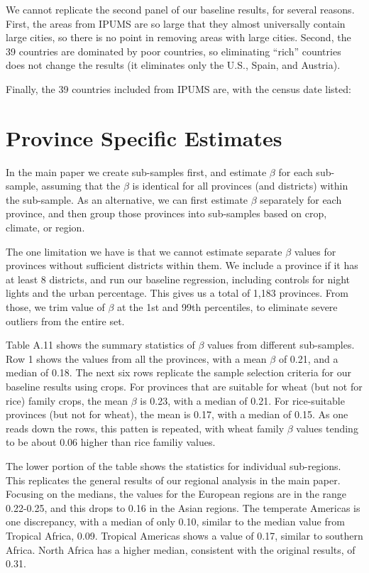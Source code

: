 \documentclass[11pt]{article}
\begin{document}
We cannot replicate the second panel of our baseline results, for several reasons. First, the areas from IPUMS are so large that they almost universally contain large cities, so there is no point in removing areas with large cities. Second, the 39 countries are dominated by poor countries, so eliminating ``rich'' countries does not change the results (it eliminates only the U.S., Spain, and Austria). 

Finally, the 39 countries included from IPUMS are, with the census date listed: 


\section{Province Specific Estimates}
In the main paper we create sub-samples first, and estimate $\beta$ for each sub-sample, assuming that the $\beta$ is identical for all provinces (and districts) within the sub-sample. As an alternative, we can first estimate $\beta$ separately for each province, and then group those provinces into sub-samples based on crop, climate, or region. 

The one limitation we have is that we cannot estimate separate $\beta$ values for provinces without sufficient districts within them. We include a province if it has at least 8 districts, and run our baseline regression, including controls for night lights and the urban percentage. This gives us a total of 1,183 provinces. From those, we trim value of $\beta$ at the 1st and 99th percentiles, to eliminate severe outliers from the entire set. 

Table A.11 shows the summary statistics of $\beta$ values from different sub-samples. Row 1 shows the values from all the provinces, with a mean $\beta$ of 0.21, and a median of 0.18. The next six rows replicate the sample selection criteria for our baseline results using crops. For provinces that are suitable for wheat (but not for rice) family crops, the mean $\beta$ is 0.23, with a median of 0.21. For rice-suitable provinces (but not for wheat), the mean is 0.17, with a median of 0.15. As one reads down the rows, this patten is repeated, with wheat family $\beta$ values tending to be about 0.06 higher than rice familiy values. 

The lower portion of the table shows the statistics for individual sub-regions. This replicates the general results of our regional analysis in the main paper. Focusing on the medians, the values for the European regions are in the range 0.22-0.25, and this drops to 0.16 in the Asian regions. The temperate Americas is one discrepancy, with a median of only 0.10, similar to the median value from Tropical Africa, 0.09. Tropical Americas shows a value of 0.17, similar to southern Africa. North Africa has a higher median, consistent with the original results, of 0.31. 
\end{document}
